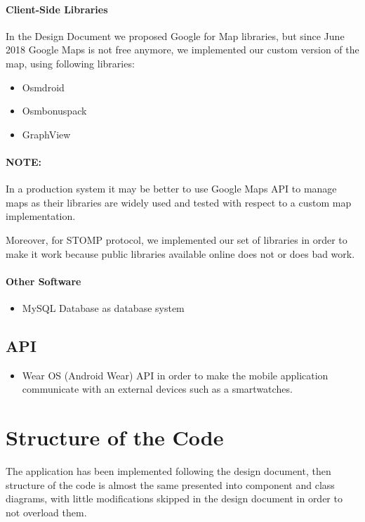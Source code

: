 \documentclass[a4paper]{article}
\begin{document}
\paragraph{Client-Side Libraries}
In the Design Document we proposed Google for Map libraries, but since June 2018 Google Maps is not free anymore, we implemented our custom version of the map, using following libraries:
\begin{itemize}
    \item Osmdroid
    \item Osmbonuspack
    \item GraphView
\end{itemize}

\paragraph{NOTE:} In a production system it may be better to use Google Maps API to manage maps as their libraries are widely used and tested with respect to a custom map implementation.

Moreover, for STOMP protocol, we implemented our set of libraries in order to make it work because public libraries available online does not or does bad work.

\paragraph{Other Software}
\begin{itemize}
    \item MySQL Database as database system
\end{itemize}

\subsection{API}
\begin{itemize}
    \item Wear OS (Android Wear) API in order to make the mobile application communicate with an external devices such as a smartwatches.
\end{itemize}

\newpage
\section{Structure of the Code}
The application has been implemented following the design document, then structure of the code is almost the same presented into component and class diagrams, with little modifications skipped in the design document in order to not overload them.
\end{document}
